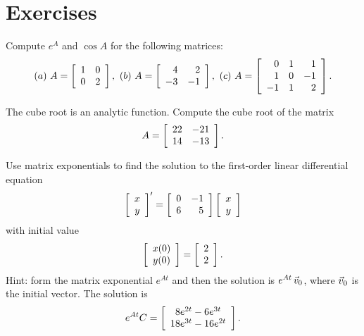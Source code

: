 \documentclass{ximera}
\author{Zack Reed}
\begin{document}
\section*{Exercises}

\begin{example}
  Compute $e^A$ and $\cos A$ for the following matrices:
  \begin{equation*}
    (a)\quad
    A = \startmat{rr}
      1 & 0 \\
      0 & 2 \\
    \stopmat,
    \quad
    (b)\quad
    A = \startmat{rr}
      4  & 2  \\
      -3 & -1 \\
    \stopmat,
    \quad
    (c)\quad
    A = \startmat{rrr}
      0 & 1 & 1 \\
      1 & 0 & -1 \\
      -1 & 1 & 2 \\
    \stopmat.
  \end{equation*}
\end{example}

\begin{example}
  The cube root is an analytic function. Compute the cube root of the
  matrix
  \begin{equation*}
    A = \startmat{rr}
      22 & -21 \\
      14 & -13 \\
    \stopmat.
  \end{equation*}
\end{example}

\begin{example}
  Use matrix exponentials to find the solution to the
  first-order linear differential equation
  \begin{equation*}
    \startmat{c}
      x \\
      y
    \stopmat^{\prime} = \startmat{rr}
      0 & -1 \\
      6 & 5
    \stopmat \startmat{c}
      x \\
      y
    \stopmat
  \end{equation*}
  with initial value
  \begin{equation*}
    \startmat{c}
      x(0) \\
      y(0)
    \stopmat = \startmat{r}
      2 \\
      2
    \stopmat.
  \end{equation*}
  Hint: form the matrix exponential $e^{At}$ and then the solution is
  $e^{At}\,\vect{v}_0$, where $\vect{v}_0$ is the initial vector.
  The solution is
  \begin{equation*}
    e^{At}C = \startmat{c}
      8e^{2t} - 6e^{3t} \\
      18e^{3t} - 16e^{2t}
    \stopmat.
  \end{equation*}
\end{example}
\end{document}
